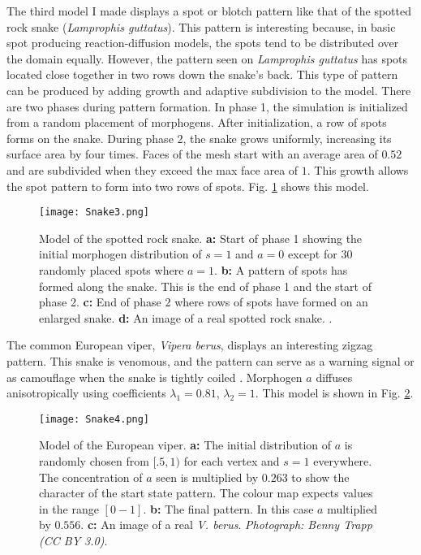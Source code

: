 \newpage
{}

The third model I made displays a spot or blotch pattern like that of the spotted rock snake (\textit{Lamprophis guttatus}). This pattern is interesting because, in basic spot producing reaction-diffusion models, the spots tend to be distributed over the domain equally. However, the pattern seen on \textit{Lamprophis guttatus} has spots located close together in two rows down the snake's back. This type of pattern can be produced by adding growth and adaptive subdivision to the model. There are two phases during pattern formation. In phase 1, the simulation is initialized from a random placement of morphogens. After initialization, a row of spots forms on the snake. During phase 2, the snake grows uniformly, increasing its surface area by four times. Faces of the mesh start with an average area of $0.52$ and are subdivided when they exceed the max face area of $1$. This growth allows the spot pattern to form into two rows of spots. Fig. \ref{fig:Snake3} shows this model.

\begin{figure}[ht]
	\centering
	\texttt{[image: Snake3.png]}
	\caption[Model of the spotted rock snake]{Model of the spotted rock snake. \textbf{a:} Start of phase 1 showing the initial morphogen distribution of $s=1$ and $a=0$ except for 30 randomly placed spots where $a=1$. \textbf{b:} A pattern of spots has formed along the snake. This is the end of phase 1 and the start of phase 2. \textbf{c:} End of phase 2 where rows of spots have formed on an enlarged snake. \textbf{d:} An image of a real spotted rock snake. \textit{}.}
	\label{fig:Snake3}
\end{figure}

\newpage
{}


The common European viper, \textit{Vipera berus}, displays an interesting zigzag pattern. This snake is venomous, and the pattern can serve as a warning signal or as camouflage when the snake is tightly coiled \citep{lillywhite2014}. Morphogen $a$ diffuses anisotropically using coefficients $\lambda_{1}=0.81$, $\lambda_{2}=1$. This model is shown in Fig. \ref{fig:Snake4}.

\begin{figure}[ht]
	\centering
	\texttt{[image: Snake4.png]}
	\caption[Model of the European viper]{Model of the European viper. \textbf{a:} The initial distribution of $a$ is randomly chosen from $[.5, 1)$ for each vertex and $s=1$ everywhere. The concentration of $a$ seen is multiplied by $0.263$ to show the character of the start state pattern. The colour map expects values in the range $[0-1]$. \textbf{b:} The final pattern. In this case $a$ multiplied by $0.556$. \textbf{c:} An image of a real \textit{V. berus}. \textit{Photograph: Benny Trapp (CC BY 3.0)}.}
	\label{fig:Snake4}
\end{figure}

